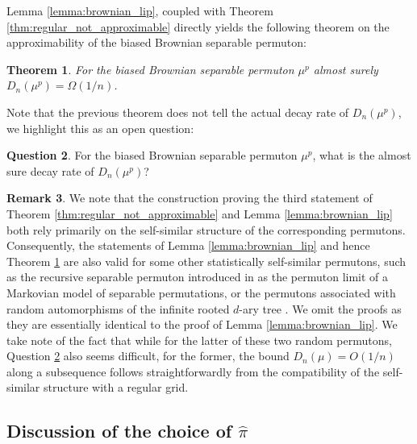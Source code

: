 \documentclass{article}
\newtheorem{theorem}{Theorem}[section]
\theoremstyle{definition}
\newtheorem{remark}[theorem]{Remark}
\newtheorem{question}[theorem]{Question}
\begin{document}
Lemma \ref{lemma:brownian_lip}, coupled with Theorem \ref{thm:regular_not_approximable} directly yields the following theorem on the approximability of the biased Brownian separable permuton:

\begin{theorem}\label{thm:brownian_approx}
    For the biased Brownian separable permuton $\mu^p$ almost surely $D_n(\mu^p)=\Omega(1/n)$.
\end{theorem}

Note that the previous theorem does not tell the actual decay rate of $D_n(\mu^p)$, we highlight this as an open question:

\begin{question} \label{quest:brownian_decay}
    For the biased Brownian separable permuton $\mu^p$, what is the almost sure decay rate of $D_n(\mu^p)$? 
\end{question}

\begin{remark}
We note that the construction proving the third statement of Theorem \ref{thm:regular_not_approximable} and Lemma \ref{lemma:brownian_lip} both rely primarily on the self-similar structure of the corresponding permutons. Consequently, the statements of Lemma \ref{lemma:brownian_lip} and hence Theorem \ref{thm:brownian_approx} are also valid for some other statistically self-similar permutons, such as the recursive separable permuton introduced in \cite{RecursiveSeparablePermuton} as the permuton limit of a Markovian model of separable permutations, or the permutons associated with random automorphisms of the infinite rooted $d$-ary tree \cite{maga2025samplingentropypermutons}. We omit the proofs as they are essentially identical to the proof of Lemma \ref{lemma:brownian_lip}. We take note of the fact that while for the latter of these two random permutons, Question \ref{quest:brownian_decay} also seems difficult, for the former, the bound \(D_n(\mu)=O(1/n)\) along a subsequence follows straightforwardly from the compatibility of the self-similar structure with a regular grid.
\end{remark}

\subsection{Discussion of the choice of $\widehat{\pi}$}
\end{document}
